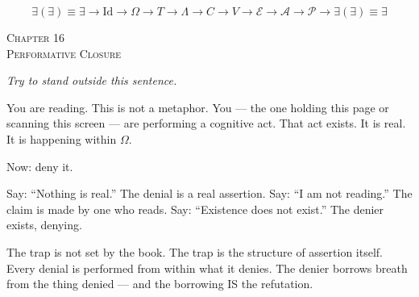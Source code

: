 \documentclass[10pt, openany, oneside]{book}
\renewcommand{\large}{\fontsize{11.5}{14}\selectfont}
\renewcommand{\huge}{\fontsize{17}{21}\selectfont}
\begin{document}
$$\boxed{\exists(\exists) \equiv \exists \to \text{Id} \to \Omega \to T \to \Lambda \to C \to V \to \mathcal{E} \to \mathcal{A} \to \mathcal{P} \to \exists(\exists) \equiv \exists}$$

%
%
%

\newpage

\begin{center}
    {\huge\scshape Chapter 16}\\[0.3em]
    {\large\scshape Performative Closure}
\end{center}

\vspace{1.5em}

\begin{center}
    \itshape
    Try to stand outside this sentence.
\end{center}

\vspace{2em}


\noindent You are reading. This is not a metaphor. You --- the one holding this page or scanning this screen --- are performing a cognitive act. That act exists. It is real. It is happening within $\Omega$.

Now: deny it.

Say: ``Nothing is real.'' The denial is a real assertion. Say: ``I am not reading.'' The claim is made by one who reads. Say: ``Existence does not exist.'' The denier exists, denying.

The trap is not set by the book. The trap is the structure of assertion itself. Every denial is performed from within what it denies. The denier borrows breath from the thing denied --- and the borrowing IS the refutation.

\vspace{1.5em}

\end{document}
